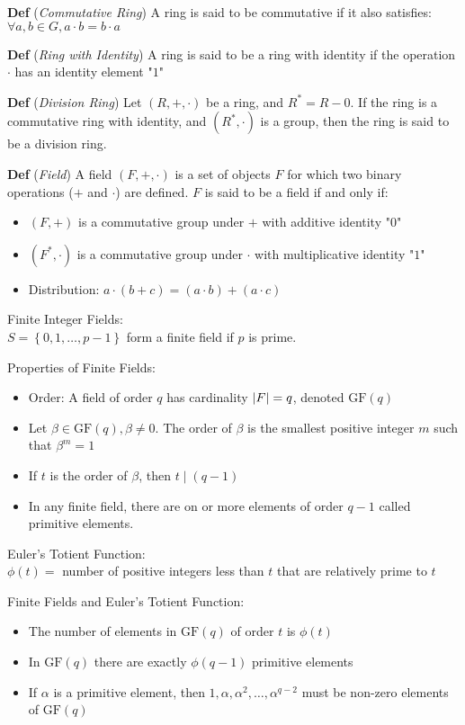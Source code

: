\documentclass[12pt,landscape]{article}
\newcommand{\tab}{\hspace{.02\textwidth}}
\newcommand{\defn}[1]{\textbf{Def} (\emph{#1})}
\newcommand{\set}[1]{\left\{ #1 \right\}}
\newcommand{\gf}[1]{\text{GF}(#1)}
\begin{document}
\begin{multicols*}{3}
\defn{Commutative Ring} A ring is said to be commutative if it also satisfies: $\forall a,b \in G, a \cdot b = b \cdot a$

\defn{Ring with Identity} A ring is said to be a ring with identity if the operation $\cdot$ has an identity element "$1$"

\defn{Division Ring} Let $(R, +, \cdot)$ be a ring, and $R^* = R - {0}$. If the ring is a commutative ring with identity, and $(R^*, \cdot)$ is a group, then the ring is said to be a division ring.

\defn{Field} A field $(F, +, \cdot)$ is a set of objects $F$ for which two binary operations ($+$ and $\cdot$) are defined. $F$ is said to be a field if and only if:
\begin{itemize}[itemsep=0em]
    \item $(F,+)$ is a commutative group under $+$ with additive identity "$0$"
    \item $(F^*, \cdot)$ is a commutative group under $\cdot$ with multiplicative identity "$1$"
    \item Distribution: $a \cdot (b + c) = (a \cdot b) + (a \cdot c)$
\end{itemize}

Finite Integer Fields:\\
\tab $S = \set{0, 1, \ldots, p - 1}$ form a finite field if $p$ is prime.

Properties of Finite Fields:\\
\begin{itemize}[itemsep=0em]
    \item Order: A field of order $q$ has cardinality $\abs{F} = q$, denoted $\gf{q}$
    \item Let $\beta \in \gf{q}, \beta \neq 0$. The order of $\beta$ is the smallest positive integer $m$ such that $\beta^m = 1$
    \item If $t$ is the order of $\beta$, then $t \mid (q - 1)$
    \item In any finite field, there are on or more elements of order $q-1$ called primitive elements.
\end{itemize}

Euler's Totient Function:\\
\tab $\phi(t) =$ number of positive integers less than $t$ that are relatively prime to $t$

Finite Fields and Euler's Totient Function:\\
\begin{itemize}[itemsep=0em]
    \item The number of elements in $\gf{q}$ of order $t$ is $\phi(t)$
    \item In $\gf{q}$ there are exactly $\phi(q - 1)$ primitive elements
    \item If $\alpha$ is a primitive element, then $1, \alpha, \alpha^2, \ldots, \alpha^{q-2}$ must be non-zero elements of $\gf{q}$
\end{itemize}


\end{multicols*}
\end{document}
